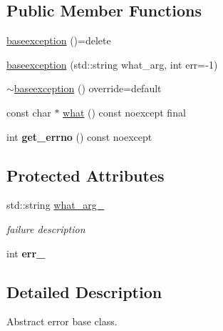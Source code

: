 \subsection*{Public Member Functions}
\begin{DoxyCompactItemize}
\item 
\hyperlink{structdevfix_1_1base_1_1error_1_1baseexception_abc1384f68bf47292ab520a96eedec596}{baseexception} ()=delete
\item 
\hyperlink{structdevfix_1_1base_1_1error_1_1baseexception_a34ac448cc55e4d9ce0ee4495abbb0f86}{baseexception} (std\+::string what\+\_\+arg, int err=-\/1)
\item 
\hyperlink{structdevfix_1_1base_1_1error_1_1baseexception_a3ae67c736d3268683cb92556c9f14bd7}{$\sim$baseexception} () override=default
\item 
const char $\ast$ \hyperlink{structdevfix_1_1base_1_1error_1_1baseexception_a16327152a55d65b1e537825231fbd452}{what} () const noexcept final
\item 
\mbox{\label{structdevfix_1_1base_1_1error_1_1baseexception_a1974deee894842b51ba42e15dbd0f8d1}} 
int {\bfseries get\+\_\+errno} () const noexcept
\end{DoxyCompactItemize}
\subsection*{Protected Attributes}
\begin{DoxyCompactItemize}
\item 
\mbox{\label{structdevfix_1_1base_1_1error_1_1baseexception_adec18389f27e1d1dae67f80caa1b617b}} 
std\+::string \hyperlink{structdevfix_1_1base_1_1error_1_1baseexception_adec18389f27e1d1dae67f80caa1b617b}{what\+\_\+arg\+\_\+}
\begin{DoxyCompactList}\small\item\em failure description \end{DoxyCompactList}\item 
\mbox{\label{structdevfix_1_1base_1_1error_1_1baseexception_aa1f58eb33d67ccf87465656f20b6d640}} 
int {\bfseries err\+\_\+}
\end{DoxyCompactItemize}


\subsection{Detailed Description}
Abstract error base class. 

